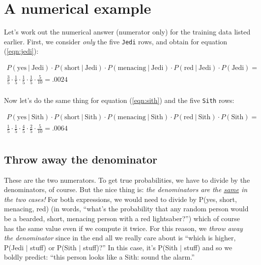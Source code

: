 \section{A numerical example}

Let's work out the numerical answer (numerator only) for the training data
listed earlier. First, we consider \textit{only} the five \texttt{Jedi} rows,
and obtain for equation (\ref{eqn:jedi}):

\vspace{-.2in}
\begin{align*}
P(\textrm{yes} \ |\ \textrm{Jedi}) \cdot
P(\textrm{short} \ |\ \textrm{Jedi}) \cdot
P(\textrm{menacing} \ |\ \textrm{Jedi}) \cdot
P(\textrm{red} \ |\ \textrm{Jedi}) \cdot P(\textrm{Jedi}) = \\
\frac{3}{5} \cdot \frac{1}{5} \cdot \frac{1}{5} \cdot \frac{1}{5} \cdot
\frac{5}{10} = .0024\\
\end{align*}

Now let's do the same thing for equation (\ref{eqn:sith}) and the five \texttt{Sith} rows:

\vspace{-.2in}
\begin{align*}
P(\textrm{yes} \ |\ \textrm{Sith}) \cdot
P(\textrm{short} \ |\ \textrm{Sith}) \cdot
P(\textrm{menacing} \ |\ \textrm{Sith}) \cdot
P(\textrm{red} \ |\ \textrm{Sith}) \cdot P(\textrm{Sith}) = \\
\frac{1}{5} \cdot \frac{1}{5} \cdot \frac{4}{5} \cdot \frac{2}{5} \cdot
\frac{5}{10} = .0064\\
\end{align*}

\subsection{Throw away the denominator}

These are the two numerators. To get true probabilities, we have to divide by
the denominators, of course. But the nice thing is: \textit{the denominators
are the \underline{same} in the two cases!} For both expressions, we would
need to divide by P(\textrm{yes}, \textrm{short}, \textrm{menacing},
\textrm{red}) (in words, ``what's the probability that any random person would
be a bearded, short, menacing person with a red lightsaber?'') which of course
has the same value even if we compute it twice. For this reason, we
\textit{throw away the denominator} since in the end all we really care about
is ``which is higher, P(Jedi $|$ stuff) or P(Sith $|$ stuff)?'' In this case,
it's P(Sith $|$ stuff) and so we boldly predict: ``this person looks like a
Sith: sound the alarm.''

